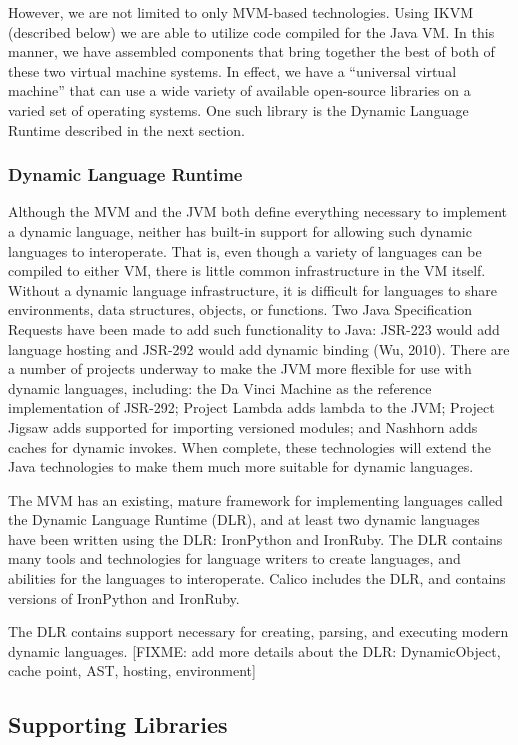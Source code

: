 \documentclass[preprint]{sigplanconf}
\begin{document}
However, we are not limited to only MVM-based technologies. Using IKVM (described below) we are able to utilize code compiled for the Java VM. In this manner, we have assembled components that bring together the best of both of these two virtual machine systems. In effect, we have a ``universal virtual machine'' that can use a wide variety of available open-source libraries on a varied set of operating systems. One such library is the Dynamic Language Runtime described in the next section.


\subsubsection{Dynamic Language Runtime}


Although the MVM and the JVM both define everything necessary to implement a dynamic language, neither has built-in support for allowing such dynamic languages to interoperate. That is, even though a variety of languages can be compiled to either VM, there is little common infrastructure in the VM itself. Without a dynamic language infrastructure, it is difficult for languages to share environments, data structures, objects, or functions. Two Java Specification Requests have been made to add such functionality to Java: JSR-223 would add language hosting and JSR-292 would add dynamic binding (Wu, 2010). There are a number of projects underway to make the JVM more flexible for use with dynamic languages, including: the Da Vinci Machine as the reference implementation of JSR-292; Project Lambda adds lambda to the JVM; Project Jigsaw adds supported for importing versioned modules; and Nashhorn adds caches for dynamic invokes. When complete, these technologies will extend the Java technologies to make them much more suitable for dynamic languages.


The MVM has an existing, mature framework for implementing languages called the Dynamic Language Runtime (DLR), and at least two dynamic languages have been written using the DLR: IronPython and IronRuby. The DLR contains many tools and technologies for language writers to create languages, and abilities for the languages to interoperate. Calico includes the DLR, and contains versions of IronPython and IronRuby.


The DLR contains support necessary for creating, parsing, and executing modern dynamic languages. [FIXME: add more details about the DLR: DynamicObject, cache point, AST, hosting, environment]


\subsection{Supporting Libraries}
\end{document}

